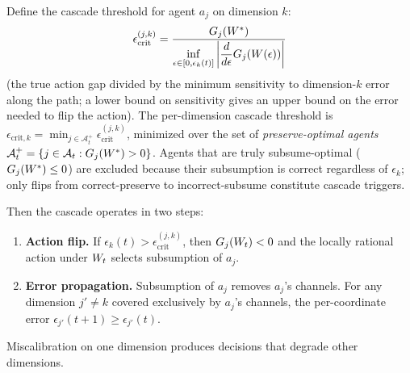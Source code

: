 \begin{lemma}[Cascade]
Define the cascade threshold for agent $a_j$ on dimension $k$:
\begin{equation}
\label{eq:cascade_threshold_def}
\epsilon_{\mathrm{crit}}^{(j,k)} =
  \frac{G_j(W^*)}
  {\displaystyle\inf_{\epsilon \in [0, \epsilon_k(t)]}
    \left|\frac{d}{d\epsilon} G_j(W(\epsilon))\right|}
\end{equation}
(the true action gap divided by the minimum sensitivity to
dimension-$k$ error along the path; a lower bound on sensitivity
gives an upper bound on the error needed to flip the action).  The
per-dimension cascade threshold is $\epsilon_{\mathrm{crit},k} =
\min_{j \in \mathcal{A}_t^+} \epsilon_{\mathrm{crit}}^{(j,k)}$,
minimized over the set of \emph{preserve-optimal agents}
$\mathcal{A}_t^+ = \{j \in \mathcal{A}_t : G_j(W^*) > 0\}$.
Agents that are truly subsume-optimal ($G_j(W^*) \leq 0$) are
excluded because their subsumption is correct regardless of
$\epsilon_k$; only flips from correct-preserve to
incorrect-subsume constitute cascade triggers.

Then the cascade operates in two steps:
\begin{enumerate}
\item[\textbf{(A)}] \textbf{Action flip.}  If
  $\epsilon_k(t) > \epsilon_{\mathrm{crit}}^{(j,k)}$, then $G_j(W_t) < 0$
  and the locally rational action under $W_t$ selects subsumption of
  $a_j$.
\item[\textbf{(B)}] \textbf{Error propagation.}  Subsumption of $a_j$
  removes $a_j$'s channels.  For any dimension $j' \neq k$ covered
  exclusively by $a_j$'s channels, the per-coordinate error
  $\epsilon_{j'}(t+1) \geq \epsilon_{j'}(t)$.
\end{enumerate}

Miscalibration on one dimension produces decisions that degrade other
dimensions.
\end{lemma}

